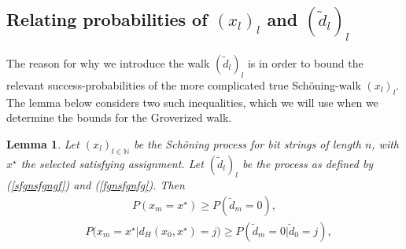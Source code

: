 \documentclass[a4paper,aps,floatfix]{revtex4}
\newtheorem{lemma}[theorem]{Lemma}
\begin{document}
\subsection{Relating probabilities of $(x_l)_l$ and $(\tilde{d}_l)_l$}

The reason for why we introduce the walk $(\tilde{d}_l)_l$ is in order to bound the relevant success-probabilities of the more complicated true Sch\"oning-walk $(x_l)_l$.  The lemma below considers two such inequalities, which we will use when we determine the bounds for the Groverized walk. 

 \begin{lemma}
\label{TransitionFromxTod}
Let $(x_l)_{l\in\mathbb{N}}$ be the Sch\"oning process for bit strings of length $n$, with $x^{\star}$ the selected satisfying assignment. Let $(\tilde{d}_l)_{l}$ be the process as defined by (\ref{sfgnsfgngf}) and (\ref{fgnsfgnfg}).  Then
\begin{equation}
\label{wrtnwrntwrt}
\begin{split}
 P(x_m  = x^{\star})\geq P(\tilde{d}_m = 0),
\end{split}
\end{equation}
\begin{equation}
\label{dfbwbwrttrn}
\begin{split}
&  P\big(  x_m = x^{\star}|d_H(x_0,x^{\star}) = j\big)\geq P(\tilde{d}_m = 0|\tilde{d}_0 = j), 
\end{split}
\end{equation}

\end{lemma}
\end{document}
